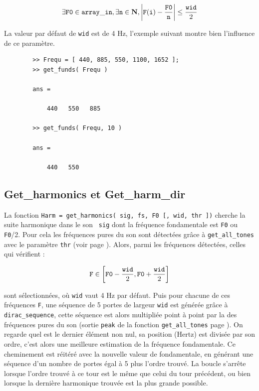     $$\exists {\tt F0} \in {\tt array\_in},\exists {\tt n} \in \textbf{N}, \left|{\tt F(i)}-\frac{\tt
    F0}{\tt n}\right| \leq \frac{\tt wid}{2}$$

    La valeur par d{\'e}faut de {\tt wid} est de 4 Hz, l'exemple suivant
    montre bien l'influence de ce param{\`e}tre.

    \begin{verbatim}
        >> Frequ = [ 440, 885, 550, 1100, 1652 ];
        >> get_funds( Frequ )

        ans =

            440   550   885

        >> get_funds( Frequ, 10 )

        ans =

            440   550
    \end{verbatim}

    \newpage
    \subsection{Get\_harmonics et Get\_harm\_dir}
    \label{getharmonics}
    La fonction
    {\tt Harm = get\_harmonics( sig, fs, F0 [, wid, thr ])}
    cherche la suite harmonique dans le son {\tt
    sig} dont la fr{\'e}quence fondamentale est {\tt F0} ou {\tt
    F0}/2. Pour cela les fr{\'e}quences pures du son sont d{\'e}tect{\'e}es
    gr{\^a}ce {\`a} {\tt get\_all\_tones} avec le param{\`e}tre {\tt thr} (voir
    page \pageref{getalltones}). Alors, parmi les fr{\'e}quences
    d{\'e}tect{\'e}es, celles qui v{\'e}rifient :

    $$ {\tt F} \in \left[{\tt F0} - \frac{\tt wid}{2} , {\tt F0} + \frac{\tt
    wid}{2}\right] $$

    \noindent sont s{\'e}lectionn{\'e}es, o{\`u} {\tt wid} vaut 4 Hz par d{\'e}faut. Puis pour chacune de
    ces fr{\'e}quences {\tt F}, une s{\'e}quence de 5 portes de largeur {\tt wid}
    est g{\'e}n{\'e}r{\'e}e gr{\^a}ce {\`a} {\tt dirac\_sequence}, cette s{\'e}quence est
    alors multipli{\'e}e point {\`a} point par la \dsp des fr{\'e}quences
    pures du son (sortie {\tt peak} de la fonction
    {\tt get\_all\_tones} page \pageref{getalltones}). On regarde quel est le
    dernier {\'e}l{\'e}ment non nul, sa position (Hertz) est divis{\'e}e
    par son ordre, c'est alors une meilleure estimation de la
    fr{\'e}quence fondamentale. Ce cheminement est r{\'e}it{\'e}r{\'e} avec la
    nouvelle valeur de fondamentale, en g{\'e}n{\'e}rant une s{\'e}quence d'un
    nombre de portes {\'e}gal {\`a} 5 plus l'ordre trouv{\'e}. La boucle s'arr{\^e}te
    lorsque l'ordre trouv{\'e} {\`a} ce tour est le m{\^e}me que celui
    du tour pr{\'e}c{\'e}dent, ou bien lorsque la derni{\`e}re harmonique
    trouv{\'e}e est la plus grande possible.\\

